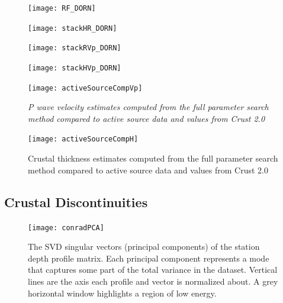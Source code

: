 \documentclass[draft, 12pt]{article}
\begin{document}
\begin{figure}
  \centering
  \texttt{[image: RF\_DORN]}
  \caption{}
  \label{fig:RF_DORN}
\end{figure}


\begin{figure}
  \centering
  \texttt{[image: stackHR\_DORN]}
  \caption{}
  \label{fig:HR_DORN}
\end{figure}

\begin{figure}
  \centering
  \texttt{[image: stackRVp\_DORN]}
  \caption{}
  \label{fig:RVp_DORN}
\end{figure}

\begin{figure}
  \centering
  \texttt{[image: stackHVp\_DORN]}
  \caption{}
  \label{fig:HVp_DORN}
\end{figure}

\begin{figure}
  \centering
  \texttt{[image: activeSourceCompVp]}
  \caption{\it{P} wave velocity estimates computed from the full parameter search method compared to active source data and values from Crust 2.0}
  \label{fig:activeVp}
\end{figure}

\begin{figure}
  \centering
  \texttt{[image: activeSourceCompH]}
  \caption{Crustal thickness estimates computed from the full parameter search method compared to active source data and values from Crust 2.0}
  \label{fig:activeH}
\end{figure}


\subsection{Crustal Discontinuities}

\begin{figure}
  \centering
  \texttt{[image: conradPCA]}
  \caption{The SVD singular vectors (principal components) of the station depth profile matrix. Each principal component represents a mode that captures some part of the total variance in the dataset. Vertical lines are the axis each profile and vector is normalized about. A grey horizontal window highlights a region of low energy.}
  \label{fig:conradPCA}
\end{figure}
\end{document}
